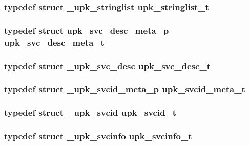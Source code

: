 \subsubsection[{upk\_\-stringlist\_\-t}]{\setlength{\rightskip}{0pt plus 5cm}typedef struct {\bf \_\-upk\_\-stringlist} {\bf upk\_\-stringlist\_\-t}}\label{tp_8c_a609af6d31e120d42a721fc51613e10d5}
\subsubsection[{upk\_\-svc\_\-desc\_\-meta\_\-t}]{\setlength{\rightskip}{0pt plus 5cm}typedef  struct {\bf upk\_\-svc\_\-desc\_\-meta\_\-p}  {\bf upk\_\-svc\_\-desc\_\-meta\_\-t}}\label{tp_8c_a3667b70a705d2740fcb2bd53be2b06b7}
\subsubsection[{upk\_\-svc\_\-desc\_\-t}]{\setlength{\rightskip}{0pt plus 5cm}typedef struct {\bf \_\-upk\_\-svc\_\-desc} {\bf upk\_\-svc\_\-desc\_\-t}}\label{tp_8c_ab30da8b354cc1afbb09e1ba870fafdf4}
\subsubsection[{upk\_\-svcid\_\-meta\_\-t}]{\setlength{\rightskip}{0pt plus 5cm}typedef  struct {\bf \_\-upk\_\-svcid\_\-meta\_\-p}  {\bf upk\_\-svcid\_\-meta\_\-t}}\label{tp_8c_a53b8b09fbfa3beacfeb0eadf9a69f56f}
\subsubsection[{upk\_\-svcid\_\-t}]{\setlength{\rightskip}{0pt plus 5cm}typedef struct {\bf \_\-upk\_\-svcid} {\bf upk\_\-svcid\_\-t}}\label{tp_8c_a891b86f6ef13ffc8e4c2aa8cbd10b3da}
\subsubsection[{upk\_\-svcinfo\_\-t}]{\setlength{\rightskip}{0pt plus 5cm}typedef struct {\bf \_\-upk\_\-svcinfo}  {\bf upk\_\-svcinfo\_\-t}}\label{tp_8c_afe263b7c32f652aa2cda7acc0ab22cc1}
